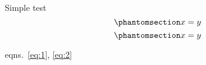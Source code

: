 Simple test
\begin{equation}\phantomsection\label{eq:1}{x=y}\end{equation}
\begin{equation}\phantomsection\label{eq:2}{x=y}\end{equation}

eqns.~\ref{eq:1}, \ref{eq:2}
